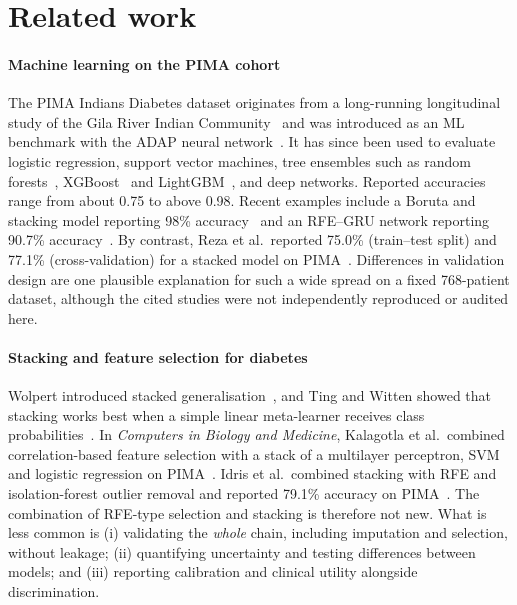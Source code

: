 \documentclass[preprint,12pt,authoryear=false]{elsarticle}
\begin{document}
\section{Related work}
\label{sec:related}

\paragraph{Machine learning on the PIMA cohort}
The PIMA Indians Diabetes dataset originates from a long-running longitudinal study of the Gila River Indian Community~\cite{knowler1978} and was introduced as an ML benchmark with the ADAP neural network~\cite{smith1988adap}. It has since been used to evaluate logistic regression, support vector machines, tree ensembles such as random forests~\cite{breiman2001rf}, XGBoost~\cite{chen2016xgboost} and LightGBM~\cite{ke2017lightgbm}, and deep networks. Reported accuracies range from about 0.75 to above 0.98. Recent examples include a Boruta and stacking model reporting 98\% accuracy~\cite{zhou2023boruta} and an RFE--GRU network reporting 90.7\% accuracy~\cite{shams2025rfegru}. By contrast, Reza et al.\ reported 75.0\% (train--test split) and 77.1\% (cross-validation) for a stacked model on PIMA~\cite{reza2024stacking}. Differences in validation design are one plausible explanation for such a wide spread on a fixed 768-patient dataset, although the cited studies were not independently reproduced or audited here.

\paragraph{Stacking and feature selection for diabetes}
Wolpert introduced stacked generalisation~\cite{wolpert1992stacked}, and Ting and Witten showed that stacking works best when a simple linear meta-learner receives class probabilities~\cite{ting1999issues}. In \emph{Computers in Biology and Medicine}, Kalagotla et al.\ combined correlation-based feature selection with a stack of a multilayer perceptron, SVM and logistic regression on PIMA~\cite{kalagotla2021stacking}. Idris et al.\ combined stacking with RFE and isolation-forest outlier removal and reported 79.1\% accuracy on PIMA~\cite{idris2024stacking}. The combination of RFE-type selection and stacking is therefore not new. What is less common is (i) validating the \emph{whole} chain, including imputation and selection, without leakage; (ii) quantifying uncertainty and testing differences between models; and (iii) reporting calibration and clinical utility alongside discrimination.
\end{document}
